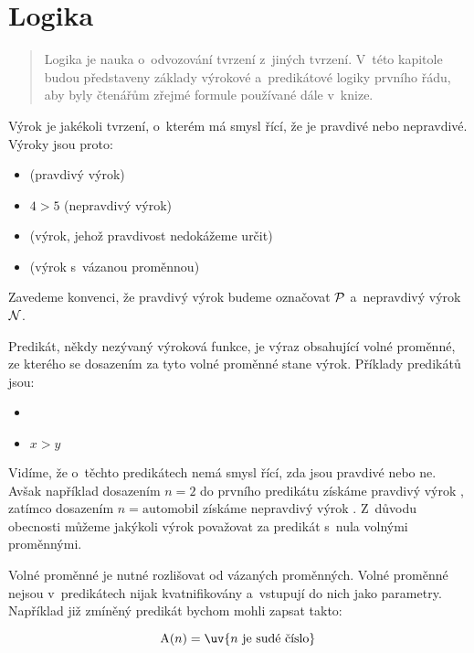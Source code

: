 \chapter{Logika}

\begin{abstract}
Logika je nauka o~odvozování tvrzení z~jiných tvrzení. V~této kapitole budou představeny základy výrokové a~predikátové logiky prvního řádu, aby byly čtenářům zřejmé formule používané dále v~knize.
\end{abstract}

Výrok je jakékoli tvrzení, o~kterém má smysl řící, že je pravdivé nebo nepravdivé. Výroky jsou proto:

\begin{itemize}
	\item {} (pravdivý výrok)
	\item \(4 > 5\) (nepravdivý výrok)
	\item {} (výrok, jehož pravdivost nedokážeme určit)
	\item {} (výrok s~vázanou proměnnou)
\end{itemize}

Zavedeme konvenci, že pravdivý výrok budeme označovat \(\mathcal{P}\) a~nepravdivý výrok \(\mathcal{N}\).

Predikát, někdy nezývaný výroková funkce, je výraz obsahující volné proměnné, ze kterého se dosazením za tyto volné proměnné stane výrok. Příklady predikátů jsou:

\begin{itemize}
	\item {}
	\item \(x > y\)
\end{itemize}

Vidíme, že o~těchto predikátech nemá smysl řící, zda jsou pravdivé nebo ne. Avšak například dosazením \(n = 2\) do prvního predikátu získáme pravdivý výrok , zatímco dosazením \(n = \mathrm{automobil}\) získáme nepravdivý výrok . Z~důvodu obecnosti můžeme jakýkoli výrok považovat za predikát s~nula volnými proměnnými.

Volné proměnné je nutné rozlišovat od vázaných proměnných. Volné proměnné nejsou v~predikátech nijak kvatnifikovány a~vstupují do nich  jako parametry. Například již zmíněný predikát bychom mohli zapsat takto:

\begin{equation}
\predicate{A}(n) = \text{\uv{\(n\) je sudé číslo}}
\end{equation}

